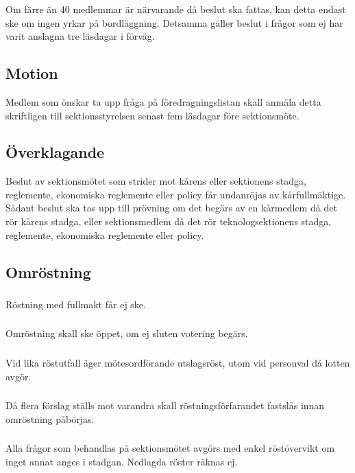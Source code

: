 \documentclass[a4paper]{dtek}
\begin{document}
\subsubsection{}
Om färre än 40 medlemmar är närvarande då beslut ska fattas, kan detta endast ske om ingen yrkar på bordläggning. Detsamma gäller beslut i frågor som ej har varit anslagna tre läsdagar i förväg.
\subsection{Motion}
Medlem som önskar ta upp fråga på föredragningslistan skall anmäla detta skriftligen till sektionsstyrelsen senast fem läsdagar före sektionsmöte.
\subsection{Överklagande}
Beslut av sektionsmötet som strider mot kårens eller sektionens stadga, reglemente, ekonomiska reglemente eller policy får undanröjas av kårfullmäktige. Sådant beslut ska tas upp till prövning om det begärs av en kårmedlem då det rör kårens stadga, eller sektionsmedlem då det rör teknologsektionens stadga, reglemente, ekonomiska reglemente eller policy.
\subsection{Omröstning}
\subsubsection{}
Röstning med fullmakt får ej ske.
\subsubsection{}
Omröstning skall ske öppet, om ej sluten votering begärs.
\subsubsection{}
Vid lika röstutfall äger mötesordförande utslagsröst, utom vid personval då lotten avgör.
\subsubsection{}
Då flera förslag ställs mot varandra skall röstningsförfarandet fastslås innan omröstning påbörjas.
\subsubsection{}
Alla frågor som behandlas på sektionsmötet avgörs med enkel röstövervikt om inget annat anges i stadgan. Nedlagda röster räknas ej.
\end{document}
